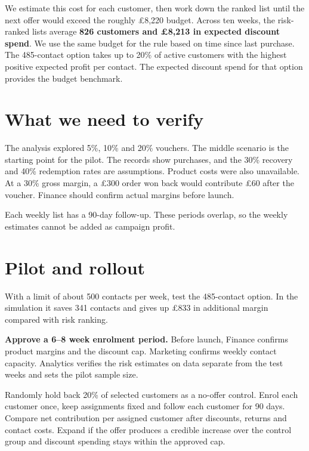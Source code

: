 \documentclass[a4paper,11pt]{article}
\begin{document}
We estimate this cost for each customer, then work down the ranked list until the next offer would exceed the roughly £8,220 budget. Across ten weeks, the risk-ranked lists average \textbf{826 customers and £8,213 in expected discount spend}. We use the same budget for the rule based on time since last purchase. The 485-contact option takes up to 20\% of active customers with the highest positive expected profit per contact. The expected discount spend for that option provides the budget benchmark.

\section*{What we need to verify}
The analysis explored 5\%, 10\% and 20\% vouchers. The middle scenario is the starting point for the pilot. The records show purchases, and the 30\% recovery and 40\% redemption rates are assumptions. Product costs were also unavailable. At a 30\% gross margin, a £300 order won back would contribute £60 after the voucher. Finance should confirm actual margins before launch.

Each weekly list has a 90-day follow-up. These periods overlap, so the weekly estimates cannot be added as campaign profit.

\section*{Pilot and rollout}
With a limit of about 500 contacts per week, test the 485-contact option. In the simulation it saves 341 contacts and gives up £833 in additional margin compared with risk ranking.

\textbf{Approve a 6--8 week enrolment period.} Before launch, Finance confirms product margins and the discount cap. Marketing confirms weekly contact capacity. Analytics verifies the risk estimates on data separate from the test weeks and sets the pilot sample size.

Randomly hold back 20\% of selected customers as a no-offer control. Enrol each customer once, keep assignments fixed and follow each customer for 90 days. Compare net contribution per assigned customer after discounts, returns and contact costs. Expand if the offer produces a credible increase over the control group and discount spending stays within the approved cap.
\end{document}
